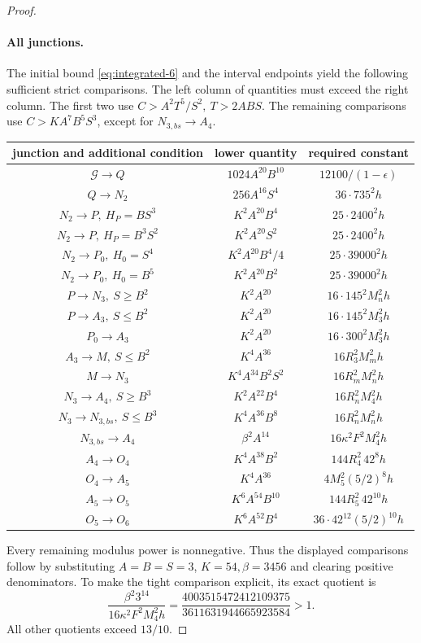 \documentclass[12pt]{article}
\numberwithin{equation}{section}
\begin{document}
\begin{proof}
\paragraph{All junctions.}
The initial bound \eqref{eq:integrated-6} and the interval endpoints yield the following
sufficient strict comparisons. The left column of quantities must exceed
the right column. The first two use \(C>A^2T^5/S^2,\ T>2ABS\).
The remaining comparisons use $C>KA^7B^5S^3$, except for
$N_{3,bs}\to A_4$.
\begin{center}\small
\begin{tabular}{c|c|c}
junction and additional condition&lower quantity&required constant\\\hline
\(\mathcal G\to Q\)&\(1024A^{20}B^{10}\)&\(12100/(1-\epsilon)\)\\
\(Q\to N_2\)&\(256A^{16}S^4\)&\(36\cdot735^2h\)\\
\(N_2\to P,\ H_P=BS^3\)&\(K^2A^{20}B^4\)&\(25\cdot2400^2h\)\\
\(N_2\to P,\ H_P=B^3S^2\)&\(K^2A^{20}S^2\)&\(25\cdot2400^2h\)\\
\(N_2\to P_0,\ H_0=S^4\)&\(K^2A^{20}B^4/4\)&\(25\cdot39000^2h\)\\
\(N_2\to P_0,\ H_0=B^5\)&\(K^2A^{20}B^2\)&\(25\cdot39000^2h\)\\
\(P\to N_3,\ S\ge B^2\)&\(K^2A^{20}\)&\(16\cdot145^2M_n^2h\)\\
\(P\to A_3,\ S\le B^2\)&\(K^2A^{20}\)&\(16\cdot145^2M_3^2h\)\\
\(P_0\to A_3\)&\(K^2A^{20}\)&\(16\cdot300^2M_3^2h\)\\
\(A_3\to M,\ S\le B^2\)&\(K^4A^{36}\)&\(16R_3^2M_m^2h\)\\
\(M\to N_3\)&\(K^4A^{34}B^2S^2\)&\(16R_m^2M_n^2h\)\\
\(N_3\to A_4,\ S\ge B^3\)&\(K^2A^{22}B^4\)&\(16R_n^2M_4^2h\)\\
\(N_3\to N_{3,bs},\ S\le B^3\)&\(K^4A^{36}B^8\)&\(16R_n^2M_n^2h\)\\
\(N_{3,bs}\to A_4\)&\(\beta^2A^{14}\)&\(16\kappa^2F^2M_4^2h\)\\
\(A_4\to O_4\)&\(K^4A^{38}B^2\)&\(144R_4^2\,42^8h\)\\
\(O_4\to A_5\)&\(K^4A^{36}\)&\(4M_5^2(5/2)^8h\)\\
\(A_5\to O_5\)&\(K^6A^{54}B^{10}\)&\(144R_5^2\,42^{10}h\)\\
\(O_5\to O_6\)&\(K^6A^{52}B^4\)&\(36\cdot42^{12}(5/2)^{10}h\)
\end{tabular}
\end{center}
Every remaining modulus power is nonnegative. Thus the displayed
comparisons follow by substituting \(A=B=S=3\), \(K=54,\beta=3456\)
and clearing positive denominators. To make the tight comparison
explicit, its exact quotient is
\[
 \frac{\beta^2 3^{14}}{16\kappa^2F^2M_4^2h}
 =\frac{4003515472412109375}{3611631944665923584}>1.
\]
All other quotients exceed \(13/10\).


\end{proof}
\end{document}
